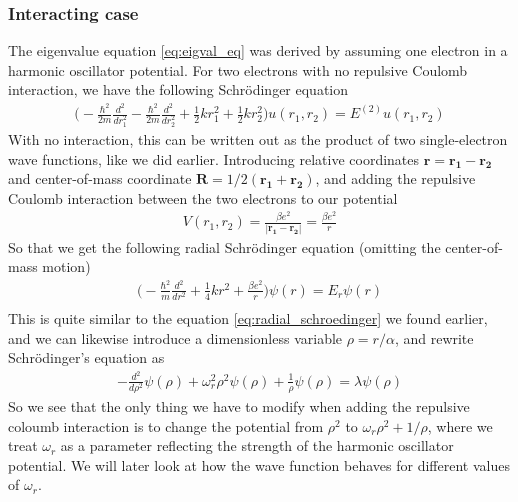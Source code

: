 \documentclass{article}
\begin{document}
\subsubsection*{Interacting case}
The eigenvalue equation \eqref{eq:eigval_eq} was derived by assuming one electron in a harmonic oscillator potential. For two electrons with no repulsive Coulomb interaction, we have the following Schrödinger equation
\begin{align*}
  \bigg(-\frac{\hbar^2}{2m}\frac{d^2}{dr_1^2} - \frac{\hbar^2}{2m}\frac{d^2}{dr_2^2} + \frac{1}{2}kr_1^2 + \frac{1}{2}kr_2^2\bigg)u(r_1,r_2) = E^{(2)}u(r_1,r_2)
\end{align*}
With no interaction, this can be written out as the product of two single-electron wave functions, like we did earlier. Introducing relative coordinates $\mathbf{r} = \mathbf{r_1} - \mathbf{r_2}$ and center-of-mass coordinate $\mathbf{R} = 1/2(\mathbf{r_1}+\mathbf{r_2})$, and adding the repulsive Coulomb interaction between the two electrons to our potential
\begin{align*}
  V(r_1,r_2) = \frac{\beta e^2}{|\mathbf{r_1}-\mathbf{r_2}|} = \frac{\beta e^2}{r}
\end{align*}
So that we get the following radial Schrödinger equation (omitting the center-of-mass motion)
\begin{align*}
  \bigg(-\frac{\hbar^2}{m}\frac{d^2}{dr^2} + \frac{1}{4}kr^2 + \frac{\beta e^2}{r}\bigg)\psi(r) = E_r\psi(r)\\
\end{align*}
This is quite similar to the equation \eqref{eq:radial_schroedinger} we found earlier, and we can likewise introduce a dimensionless variable $\rho = r/\alpha$, and rewrite Schrödinger's equation as
\begin{align*}
  -\frac{d^2}{d\rho^2}\psi(\rho) + \omega_r^2\rho^2\psi(\rho) + \frac{1}{\rho}\psi(\rho) = \lambda\psi(\rho)
\end{align*}
So we see that the only thing we have to modify when adding the repulsive coloumb interaction is to change the potential from $\rho^2$ to $\omega_r\rho^2 + 1/\rho$, where we treat $\omega_r$ as a parameter reflecting the strength of the harmonic oscillator potential. We will later look at how the wave function behaves for different values of $\omega_r$.
\end{document}

